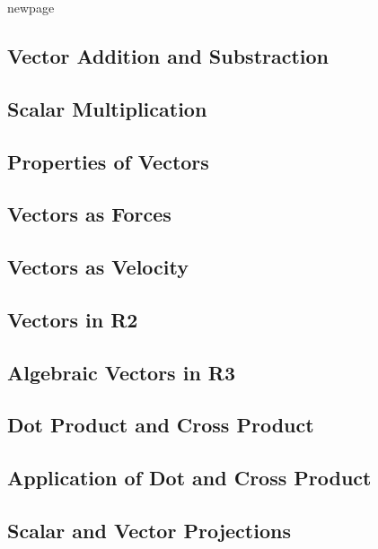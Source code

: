 \documentclass[14pt]{article}
\begin{document}
\begin{flushleft}
            newpage

        \end{flushleft}

        \subsection{Vector Addition and Substraction}

            \begin{flushleft}



            \end{flushleft}

        \subsection{Scalar Multiplication}
        \subsection{Properties of Vectors}
        \subsection{Vectors as Forces}
        \subsection{Vectors as Velocity}
        \subsection{Vectors in R2}
        \subsection{Algebraic Vectors in R3}
        \subsection{Dot Product and Cross Product}
        \subsection{Application of Dot and Cross Product}
        \subsection{Scalar and Vector Projections}
\end{document}
